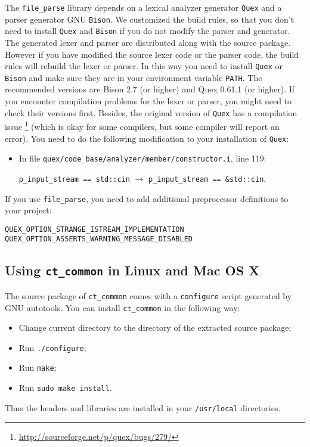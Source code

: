 \documentclass{article}
\begin{document}
The {\tt file\_parse} library depends on a lexical analyzer generator {\tt Quex} and a parser
generator GNU {\tt Bison}. We customized the build rules, so that you don't need to install
{\tt Quex} and {\tt Bison} if you do not modify the parser and generator. The generated lexer
and parser are distributed along with the source package. However if you have modified the source
lexer code or the parser code, the build rules will rebuild the lexer or parser. In this way
you need to install {\tt Quex} or {\tt Bison} and make sure they are in your environment variable
{\tt PATH}. The recommended versions are Bison 2.7 (or higher) and Quex 0.61.1 (or higher).
If you encounter compilation problems for the lexer or parser, you might need to check their versions
first. Besides, the original version of {\tt Quex} has a compilation issue
\footnote{\url{http://sourceforge.net/p/quex/bugs/279/}} (which is okay for some
compilers, but some compiler will report an error). You need to do the following modification to your
installation of {\tt Quex}:
\begin{itemize}
\item In file {\tt quex/code\_base/analyzer/member/constructor.i}, line 119:

{\tt p\_input\_stream == std::cin} $\rightarrow$  {\tt p\_input\_stream == \&std::cin}.
\end{itemize}

If you use {\tt file\_parse}, you need to add additional preprocessor definitions to your project:
\begin{verbatim}
QUEX_OPTION_STRANGE_ISTREAM_IMPLEMENTATION
QUEX_OPTION_ASSERTS_WARNING_MESSAGE_DISABLED
\end{verbatim}

\subsection{Using {\tt ct\_common} in Linux and Mac OS X}
The source package of {\tt ct\_common} comes with a {\tt configure} script generated by GNU autotools.
You can install {\tt ct\_common} in the following way:
\begin{itemize}
\item Change current directory to the directory of the extracted source package;
\item Run {\tt ./configure};
\item Run {\tt make};
\item Run {\tt sudo make install}.
\end{itemize}
Thus the headers and libraries are installed in your {\tt /usr/local} directories.
\end{document}
